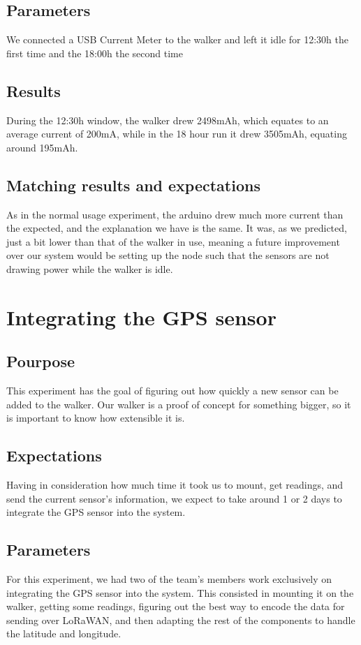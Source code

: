 	\subsection{Parameters}
		We connected a USB Current Meter to the walker and left it idle for 12:30h the first time and the 18:00h the second time
	\subsection{Results}
		During the 12:30h window, the walker drew 2498mAh, which equates to an average current of 200mA, while in the 18 hour run it drew 3505mAh, equating around 195mAh.
	\subsection{Matching results and expectations}
		As in the normal usage experiment, the arduino drew much more current than the expected, and the explanation we have is the same. It was, as we predicted, just a bit lower than that of the walker in use, meaning a future improvement over our system would be setting up the node such that the sensors are not drawing power while the walker is idle.

\section{Integrating the GPS sensor}
	\subsection{Pourpose}
	This experiment has the goal of figuring out how quickly a new sensor can be added to the walker. Our walker is a proof of concept for something bigger, so it is important to know how extensible it is.

	\subsection{Expectations}
	Having in consideration how much time it took us to mount, get readings, and send the current sensor's information, we expect to take around 1 or 2 days to integrate the GPS sensor into the system. 

	\subsection{Parameters}
	For this experiment, we had two of the team's members work exclusively on integrating the GPS sensor into the system. This consisted in mounting it on the walker, getting some readings, figuring out the best way to encode the data for sending over LoRaWAN, and then adapting the rest of the components to handle the latitude and longitude.

